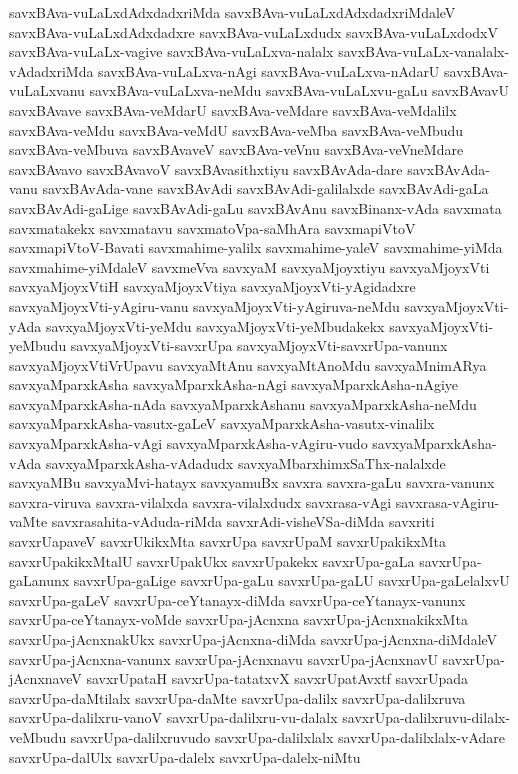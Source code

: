 {savxBAva-vuLaLxdAdxdadxriMda
savxBAva-vuLaLxdAdxdadxriMdaleV
savxBAva-vuLaLxdAdxdadxre
savxBAva-vuLaLxdudx
savxBAva-vuLaLxdodxV
savxBAva-vuLaLx-vagive
savxBAva-vuLaLxva-nalalx
savxBAva-vuLaLx-vanalalx-vAdadxriMda
savxBAva-vuLaLxva-nAgi
savxBAva-vuLaLxva-nAdarU
savxBAva-vuLaLxvanu
savxBAva-vuLaLxva-neMdu
savxBAva-vuLaLxvu-gaLu
savxBAvavU
savxBAvave
savxBAva-veMdarU
savxBAva-veMdare
savxBAva-veMdalilx
savxBAva-veMdu
savxBAva-veMdU
savxBAva-veMba
savxBAva-veMbudu
savxBAva-veMbuva
savxBAvaveV
savxBAva-veVnu
savxBAva-veVneMdare
savxBAvavo
savxBAvavoV
savxBAvasithxtiyu
savxBAvAda-dare
savxBAvAda-vanu
savxBAvAda-vane
savxBAvAdi
savxBAvAdi-galilalxde
savxBAvAdi-gaLa
savxBAvAdi-gaLige
savxBAvAdi-gaLu
savxBAvAnu
savxBinanx-vAda
savxmata
savxmatakekx
savxmatavu
savxmatoVpa-saMhAra
savxmapiVtoV
savxmapiVtoV-Bavati
savxmahime-yalilx
savxmahime-yaleV
savxmahime-yiMda
savxmahime-yiMdaleV
savxmeVva
savxyaM
savxyaMjoyxtiyu
savxyaMjoyxVti
savxyaMjoyxVtiH
savxyaMjoyxVtiya
savxyaMjoyxVti-yAgidadxre
savxyaMjoyxVti-yAgiru-vanu
savxyaMjoyxVti-yAgiruva-neMdu
savxyaMjoyxVti-yAda
savxyaMjoyxVti-yeMdu
savxyaMjoyxVti-yeMbudakekx
savxyaMjoyxVti-yeMbudu
savxyaMjoyxVti-savxrUpa
savxyaMjoyxVti-savxrUpa-vanunx
savxyaMjoyxVtiVrUpavu
savxyaMtAnu
savxyaMtAnoMdu
savxyaMnimARya
savxyaMparxkAsha
savxyaMparxkAsha-nAgi
savxyaMparxkAsha-nAgiye
savxyaMparxkAsha-nAda
savxyaMparxkAshanu
savxyaMparxkAsha-neMdu
savxyaMparxkAsha-vasutx-gaLeV
savxyaMparxkAsha-vasutx-vinalilx
savxyaMparxkAsha-vAgi
savxyaMparxkAsha-vAgiru-vudo
savxyaMparxkAsha-vAda
savxyaMparxkAsha-vAdadudx
savxyaMbarxhimxSaThx-nalalxde
savxyaMBu
savxyaMvi-hatayx
savxyamuBx
savxra
savxra-gaLu
savxra-vanunx
savxra-viruva
savxra-vilalxda
savxra-vilalxdudx
savxrasa-vAgi
savxrasa-vAgiru-vaMte
savxrasahita-vAduda-riMda
savxrAdi-visheVSa-diMda
savxriti
savxrUapaveV
savxrUkikxMta
savxrUpa
savxrUpaM
savxrUpakikxMta
savxrUpakikxMtalU
savxrUpakUkx
savxrUpakekx
savxrUpa-gaLa
savxrUpa-gaLanunx
savxrUpa-gaLige
savxrUpa-gaLu
savxrUpa-gaLU
savxrUpa-gaLelalxvU
savxrUpa-gaLeV
savxrUpa-ceYtanayx-diMda
savxrUpa-ceYtanayx-vanunx
savxrUpa-ceYtanayx-voMde
savxrUpa-jAcnxna
savxrUpa-jAcnxnakikxMta
savxrUpa-jAcnxnakUkx
savxrUpa-jAcnxna-diMda
savxrUpa-jAcnxna-diMdaleV
savxrUpa-jAcnxna-vanunx
savxrUpa-jAcnxnavu
savxrUpa-jAcnxnavU
savxrUpa-jAcnxnaveV
savxrUpataH
savxrUpa-tatatxvX
savxrUpatAvxtf
savxrUpada
savxrUpa-daMtilalx
savxrUpa-daMte
savxrUpa-dalilx
savxrUpa-dalilxruva
savxrUpa-dalilxru-vanoV
savxrUpa-dalilxru-vu-dalalx
savxrUpa-dalilxruvu-dilalx-veMbudu
savxrUpa-dalilxruvudo
savxrUpa-dalilxlalx
savxrUpa-dalilxlalx-vAdare
savxrUpa-dalUlx
savxrUpa-dalelx
savxrUpa-dalelx-niMtu
}
